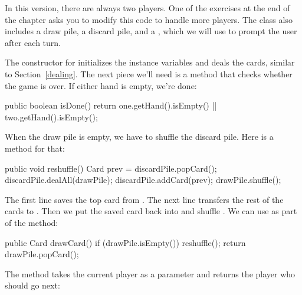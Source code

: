 In this version, there are always two players.
One of the exercises at the end of the chapter asks you to modify this code to handle more players.
The  class also includes a draw pile, a discard pile, and a , which we will use to prompt the user after each turn.

The constructor for  initializes the instance variables and deals the cards, similar to Section~\ref{dealing}.
%
%
%
%
%
%
%
The next piece we'll need is a method that checks whether the game is over.
If either hand is empty, we're done:

\begin{code}
public boolean isDone() {
    return one.getHand().isEmpty() || two.getHand().isEmpty();
}
\end{code}

When the draw pile is empty, we have to shuffle the discard pile.
Here is a method for that:

\begin{code}
public void reshuffle() {
    Card prev = discardPile.popCard();
    discardPile.dealAll(drawPile);
    discardPile.addCard(prev);
    drawPile.shuffle();
}
\end{code}

The first line saves the top card from .
The next line transfers the rest of the cards to .
Then we put the saved card back into  and shuffle .
We can use  as part of the  method:

\begin{code}
public Card drawCard() {
    if (drawPile.isEmpty()) {
        reshuffle();
    }
    return drawPile.popCard();
}
\end{code}

The  method takes the current player as a parameter and returns the player who should go next:

